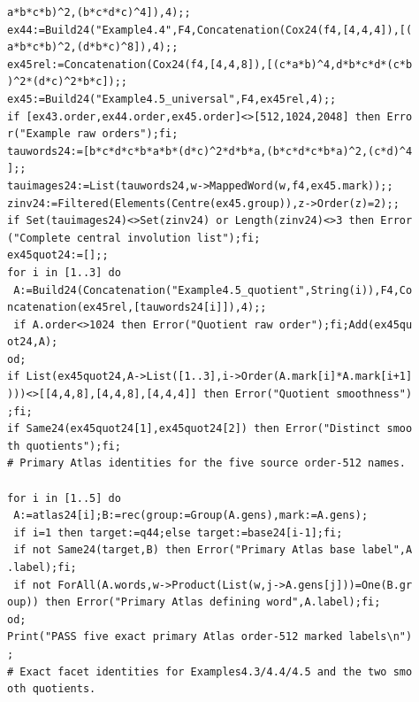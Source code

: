 \documentclass[
  11pt,
  a4paper,
]{article}
\begin{document}
\begin{verbatim}
a*b*c*b)^2,(b*c*d*c)^4]),4);;
ex44:=Build24("Example4.4",F4,Concatenation(Cox24(f4,[4,4,4]),[(
a*b*c*b)^2,(d*b*c)^8]),4);;
ex45rel:=Concatenation(Cox24(f4,[4,4,8]),[(c*a*b)^4,d*b*c*d*(c*b
)^2*(d*c)^2*b*c]);;
ex45:=Build24("Example4.5_universal",F4,ex45rel,4);;
if [ex43.order,ex44.order,ex45.order]<>[512,1024,2048] then Erro
r("Example raw orders");fi;
tauwords24:=[b*c*d*c*b*a*b*(d*c)^2*d*b*a,(b*c*d*c*b*a)^2,(c*d)^4
];;
tauimages24:=List(tauwords24,w->MappedWord(w,f4,ex45.mark));;
zinv24:=Filtered(Elements(Centre(ex45.group)),z->Order(z)=2);;
if Set(tauimages24)<>Set(zinv24) or Length(zinv24)<>3 then Error
("Complete central involution list");fi;
ex45quot24:=[];;
for i in [1..3] do
 A:=Build24(Concatenation("Example4.5_quotient",String(i)),F4,Co
ncatenation(ex45rel,[tauwords24[i]]),4);;
 if A.order<>1024 then Error("Quotient raw order");fi;Add(ex45qu
ot24,A);
od;
if List(ex45quot24,A->List([1..3],i->Order(A.mark[i]*A.mark[i+1]
)))<>[[4,4,8],[4,4,8],[4,4,4]] then Error("Quotient smoothness")
;fi;
if Same24(ex45quot24[1],ex45quot24[2]) then Error("Distinct smoo
th quotients");fi;
# Primary Atlas identities for the five source order-512 names.

for i in [1..5] do
 A:=atlas24[i];B:=rec(group:=Group(A.gens),mark:=A.gens);
 if i=1 then target:=q44;else target:=base24[i-1];fi;
 if not Same24(target,B) then Error("Primary Atlas base label",A
.label);fi;
 if not ForAll(A.words,w->Product(List(w,j->A.gens[j]))=One(B.gr
oup)) then Error("Primary Atlas defining word",A.label);fi;
od;
Print("PASS five exact primary Atlas order-512 marked labels\n")
;
# Exact facet identities for Examples4.3/4.4/4.5 and the two smo
oth quotients.


\end{verbatim}
\end{document}
